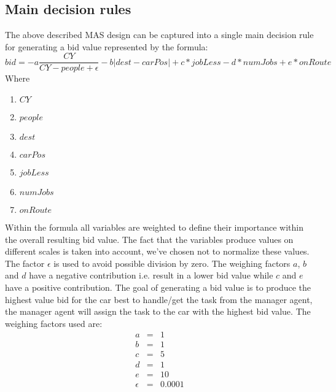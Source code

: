 \documentclass[a4paper,11pt]{article}
\begin{document}
\pagebreak

\subsection{Main decision rules}
The above described MAS design can be captured into a single main decision rule for generating a bid value represented by the formula:
\newline
\[bid = -a\frac{CY}{CY-people+\epsilon} - b|dest - carPos| + c*jobLess - d*numJobs + e*onRoute\]
\newline\newline
Where
\begin{enumerate}
	\item[] $CY$
	\item[] $people$
	\item[] $dest$ 
	\item[] $carPos$  
	\item[] $jobLess$ 
	\item[] $numJobs$
	\item[] $onRoute$ 
\end{enumerate}

Within the formula all variables are weighted to define their importance within the overall resulting bid value. The fact that the variables produce values on different scales is taken into account, we've chosen not to normalize these values. The factor $\epsilon$ is used to avoid possible division by zero. The weighing factors $a$, $b$ and $d$ have a negative contribution i.e. result in a lower bid value while $c$ and $e$ have a positive contribution. The goal of generating a bid value is to produce the highest value bid for the car best to handle/get the task from the manager agent, the manager agent will assign the task to the car with the highest bid value. The weighing factors used are:
\[\begin{array}{lcl}
a & = & 1\\
b & = & 1\\
c & = & 5\\
d & = & 1\\
e & = & 10\\
\epsilon & = & 0.0001
\end{array}\]
\end{document}
